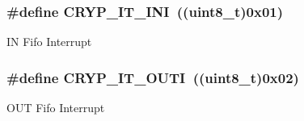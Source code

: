 \subsubsection[{C\+R\+Y\+P\+\_\+\+I\+T\+\_\+\+I\+N\+I}]{\setlength{\rightskip}{0pt plus 5cm}\#define C\+R\+Y\+P\+\_\+\+I\+T\+\_\+\+I\+N\+I~((uint8\+\_\+t)0x01)}\label{group___c_r_y_p__interrupts__definition_gab6d24428b95658217df49013a81b4f7c}
I\+N Fifo Interrupt \hypertarget{group___c_r_y_p__interrupts__definition_ga53c211cbd38a3704dfc91aa8f3d20517}{}
\subsubsection[{C\+R\+Y\+P\+\_\+\+I\+T\+\_\+\+O\+U\+T\+I}]{\setlength{\rightskip}{0pt plus 5cm}\#define C\+R\+Y\+P\+\_\+\+I\+T\+\_\+\+O\+U\+T\+I~((uint8\+\_\+t)0x02)}\label{group___c_r_y_p__interrupts__definition_ga53c211cbd38a3704dfc91aa8f3d20517}
O\+U\+T Fifo Interrupt 
